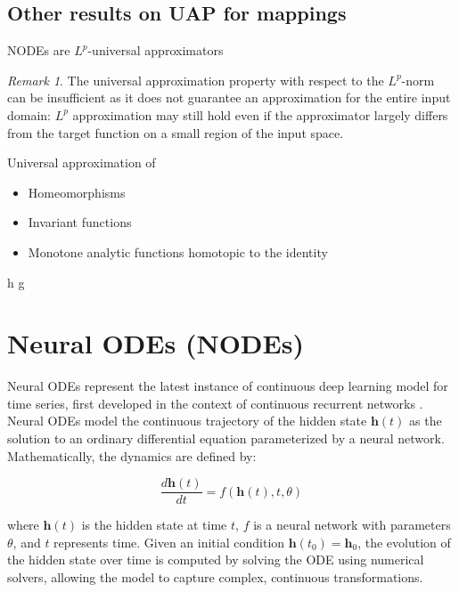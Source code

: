 \documentclass{article}
\theoremstyle{definition}
\theoremstyle{remark}
\newtheorem{remark}{Remark}
\newcounter{ct}
\begin{document}
\subsection{Other results on UAP for mappings}
NODEs are $L^p$-universal approximators \citep{li2022deep,li2022deeparxiv}
\begin{remark}
The universal approximation property with respect to the $L^p$-norm can be insufficient as it does not guarantee an approximation for the entire input domain:
 $L^p$ approximation may still hold even if the approximator largely differs from the target function on a small region of the input space.
\end{remark}


Universal approximation of 
\begin{itemize}
\item Homeomorphisms \citep{zhang2020approximation}
\item Invariant functions\citep{li2022deep}
\item Monotone analytic functions homotopic to the identity\citep{tabuada2020universal}
\end{itemize}

h\citep{tabuada2022universal}
g\citep{marchi2021training}


\section{Neural ODEs (NODEs)}
Neural ODEs \citep{chen2018neural} represent the latest instance of continuous deep learning model for time series, first developed in the context of continuous recurrent networks \citep{cohen1983absolute}.
%
Neural ODEs model the continuous trajectory of the hidden state \( \mathbf{h}(t) \) as the solution to an ordinary differential equation parameterized by a neural network. Mathematically, the dynamics are defined by:

\[
\frac{d \mathbf{h}(t)}{dt} = f(\mathbf{h}(t), t, \theta)
\]

where \( \mathbf{h}(t) \) is the hidden state at time \( t \), \( f \) is a neural network with parameters \( \theta \), and \( t \) represents time. Given an initial condition \( \mathbf{h}(t_0) = \mathbf{h}_0 \), the evolution of the hidden state over time is computed by solving the ODE using numerical solvers, allowing the model to capture complex, continuous transformations.
\end{document}
